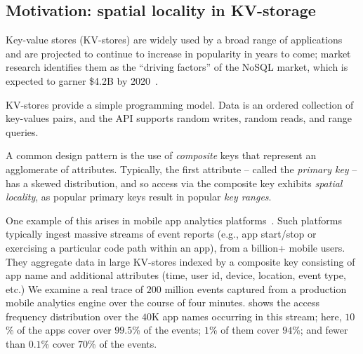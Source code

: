 \subsection{Motivation:  spatial locality in KV-storage}

Key-value stores (KV-stores) are widely used  by a broad range of applications and are projected
to continue to increase in popularity in years to come; market research  identifies them as the 
``driving factors'' of the NoSQL market, which is expected to garner \$4.2B by 2020~\cite{alliedmarketresearch}.

KV-stores provide a simple programming model. 
Data is an ordered collection of key-values pairs, and  the API supports random writes, 
random reads, and range queries. 

A common design pattern is the use of \emph{composite} keys that represent an agglomerate of attributes.
Typically, the first attribute -- called the \emph{primary key} -- has a skewed distribution, and so   access via the composite key exhibits \emph{spatial locality}, as 
popular primary keys result in popular \emph{key ranges}. 

One example of this arises in mobile app analytics platforms~\cite{medium-mobile-analytics}.   
Such platforms typically ingest massive streams of event reports (e.g., app start/stop or  exercising a particular code path within an app),
from a billion+ mobile users.  
They aggregate data in large KV-stores indexed by a composite key consisting of app name and additional attributes (time, user id, device, location, event type, etc.) 
We examine a real trace of  $200$ million events captured from a production mobile analytics engine over the course of four minutes.  
 shows the access frequency distribution over the  $40$K app names occurring in this stream; here,
$10$\% of the apps cover over $99.5$\% of the events; $1$\% of them  cover $94$\%; and fewer than $0.1$\% cover $70$\% of the events. 


